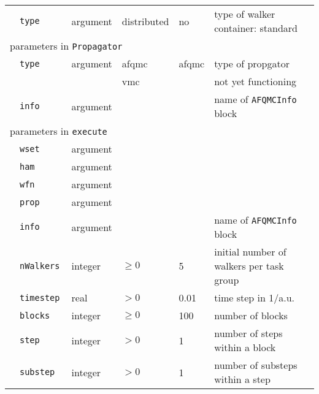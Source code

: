 \begin{table}[h]
\begin{center}
\begin{tabularx}{\textwidth}{l l l l l l }
   &   \texttt{type            } &  argument   & distributed & no   & type of walker container: standard \\
\multicolumn{6}{l}{parameters in \texttt{Propagator}} \\
   &   \texttt{type            } &  argument   & afqmc & afqmc & type of propgator \\
   &   \texttt{                } &             &  vmc  &       & not yet functioning \\
   &   \texttt{info            } &  argument   &       &       & name of \texttt{AFQMCInfo} block \\
\multicolumn{6}{l}{parameters in \texttt{execute}} \\
   &   \texttt{wset            } &  argument    &         &      &  \\
   &   \texttt{ham             } & argument     &         &      &  \\
   &   \texttt{wfn             } & argument     &         &      &  \\
   &   \texttt{prop            } & argument     &         &      &  \\
   &   \texttt{info            } &  argument    &         &      & name of \texttt{AFQMCInfo} block \\
   &   \texttt{nWalkers        } &  integer     & $\ge 0$ & 5    & initial number of walkers per task group   \\
   &   \texttt{timestep        } &  real        & $> 0$   & 0.01 & time step in 1/a.u. \\
   &   \texttt{blocks          } &  integer     & $\ge 0$ & 100  & number of blocks            \\
   &   \texttt{step            } &  integer     & $> 0$   & 1    & number of steps within a block \\
   &   \texttt{substep         } &  integer     & $> 0$   & 1    & number of substeps within a step \\
  \hline
\end{tabularx}
\end{center}
\label{table:afqmc_basic}
\end{table}


